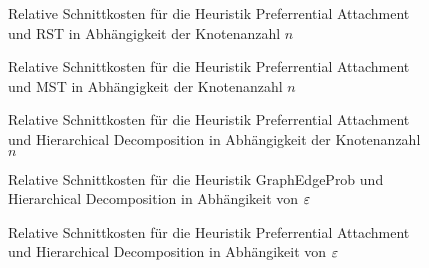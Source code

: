 \begin{figure}
    \centering
    
    \caption{Relative Schnittkosten für die Heuristik Preferrential Attachment und RST in Abhängigkeit der Knotenanzahl $n$}
\end{figure}

\begin{figure}
    \centering
    
    \caption{Relative Schnittkosten für die Heuristik Preferrential Attachment und MST in Abhängigkeit der Knotenanzahl $n$}
\end{figure}

\begin{figure}
    \centering
    
    \caption{Relative Schnittkosten für die Heuristik Preferrential Attachment und Hierarchical Decomposition in Abhängigkeit der Knotenanzahl $n$}
\end{figure}

\pagebreak

%    
%
%    


\begin{figure}
    \centering
    
    \caption{Relative Schnittkosten für die Heuristik GraphEdgeProb und Hierarchical Decomposition in Abhängikeit von $\varepsilon$}
\end{figure}

%    
%
%    

\begin{figure}
    \centering
    
    \caption{Relative Schnittkosten für die Heuristik Preferrential Attachment und Hierarchical Decomposition in Abhängikeit von $\varepsilon$}
\end{figure}
